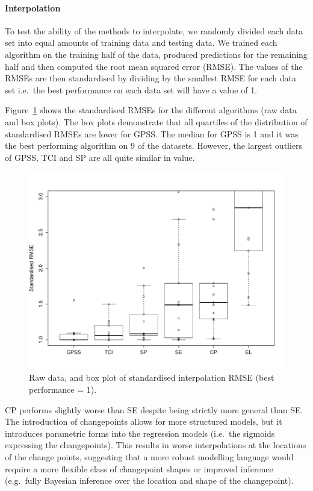 \documentclass{article}
\def\ie{i.e.\ }
\def\eg{e.g.\ }
\begin{document}
\paragraph{Interpolation}

To test the ability of the methods to interpolate, we randomly divided each data set into equal amounts of training data and testing data.
We trained each algorithm on the training half of the data, produced predictions for the remaining half and then computed the root mean squared error (RMSE).
The values of the RMSEs are then standardised by dividing by the smallest RMSE for each data set \ie the best performance on each data set will have a value of 1.

Figure~\ref{fig:box_interp} shows the standardised RMSEs for the different algorithms (raw data and box plots).
The box plots demonstrate that all quartiles of the distribution of standardised RMSEs are lower for GPSS.
The median for GPSS is 1 and it was the best performing algorithm on 9 of the datasets.
However, the largest outliers of GPSS, TCI and SP are all quite similar in value.

\begin{figure}[h]
\centering
\includegraphics[width=\columnwidth]{figures/box_interp}
\caption{
Raw data, and box plot of standardised interpolation RMSE (best performance = 1).
}
\label{fig:box_interp}
\end{figure}

CP performs slightly worse than SE despite being strictly more general than SE.
The introduction of changepoints allows for more structured models, but it introduces parametric forms into the regression models (\ie the sigmoids expressing the changepoints).
This results in worse interpolations at the locations of the change points, suggesting that a more robust modelling language would require a more flexible class of changepoint shapes or improved inference (\eg fully Bayesian inference over the location and shape of the changepoint).
\end{document}
